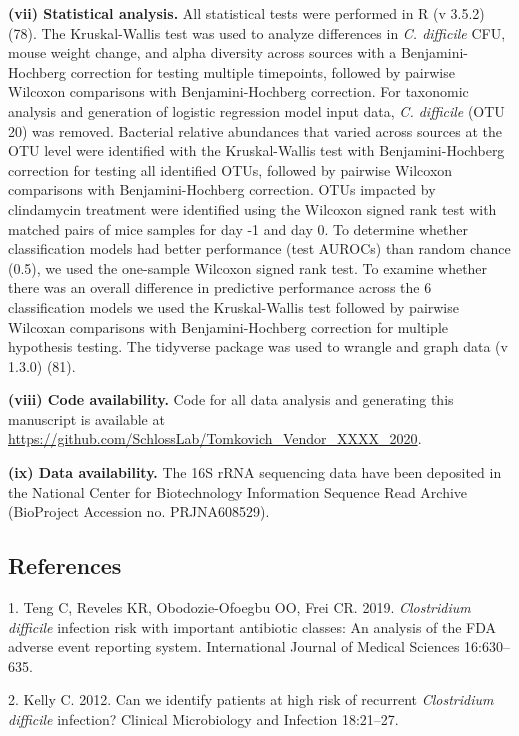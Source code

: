 \documentclass[11pt,]{article}
\begin{document}
\textbf{(vii) Statistical analysis.} All statistical tests were
performed in R (v 3.5.2) (78). The Kruskal-Wallis test was used to
analyze differences in \emph{C. difficile} CFU, mouse weight change, and
alpha diversity across sources with a Benjamini-Hochberg correction for
testing multiple timepoints, followed by pairwise Wilcoxon comparisons
with Benjamini-Hochberg correction. For taxonomic analysis and
generation of logistic regression model input data, \emph{C. difficile}
(OTU 20) was removed. Bacterial relative abundances that varied across
sources at the OTU level were identified with the Kruskal-Wallis test
with Benjamini-Hochberg correction for testing all identified OTUs,
followed by pairwise Wilcoxon comparisons with Benjamini-Hochberg
correction. OTUs impacted by clindamycin treatment were identified using
the Wilcoxon signed rank test with matched pairs of mice samples for day
-1 and day 0. To determine whether classification models had better
performance (test AUROCs) than random chance (0.5), we used the
one-sample Wilcoxon signed rank test. To examine whether there was an
overall difference in predictive performance across the 6 classification
models we used the Kruskal-Wallis test followed by pairwise Wilcoxan
comparisons with Benjamini-Hochberg correction for multiple hypothesis
testing. The tidyverse package was used to wrangle and graph data (v
1.3.0) (81).

\textbf{(viii) Code availability.} Code for all data analysis and
generating this manuscript is available at
\url{https://github.com/SchlossLab/Tomkovich_Vendor_XXXX_2020}.

\textbf{(ix) Data availability.} The 16S rRNA sequencing data have been
deposited in the National Center for Biotechnology Information Sequence
Read Archive (BioProject Accession no. PRJNA608529).

\newpage

\subsection{References}\label{references}

\hypertarget{refs}{}
\hypertarget{ref-Teng2019}{}
1. Teng C, Reveles KR, Obodozie-Ofoegbu OO, Frei CR. 2019.
\emph{Clostridium difficile} infection risk with important antibiotic
classes: An analysis of the FDA adverse event reporting system.
International Journal of Medical Sciences 16:630--635.

\hypertarget{ref-Kelly2012}{}
2. Kelly C. 2012. Can we identify patients at high risk of recurrent
\emph{Clostridium difficile} infection? Clinical Microbiology and
Infection 18:21--27.
\end{document}

